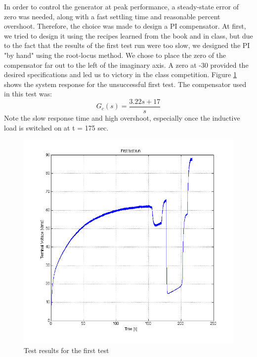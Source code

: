 In order to control the generator at peak performance, a steady-state error of zero was needed, along with a fast settling time and reasonable percent overshoot. Therefore, the choice was made to design a PI compensator. At first, we tried to design it using the recipes learned from the book and in class, but due to the fact that the results of the first test run were too slow, we designed the PI "by hand" using the root-locus method. We chose to place the zero of the compensator far out to the left of the imaginary axis. A zero at -30 provided the desired specifications and led us to victory in the class competition.
Figure \ref{fig:test1} shows the system response for the unsuccessful first test. The compensator used in this test was:
\begin{equation}
G_c(s) = \frac{3.22s + 17}{s}
\end{equation}
Note the slow response time and high overshoot, especially once the inductive load is switched on at t = 175 sec.


\begin{figure}[h!]
\begin{center}
\includegraphics[scale=0.6]{./img/data_first.png}
\end{center}
\caption{Test results for the first test}
\label{fig:test1}
\end{figure}

